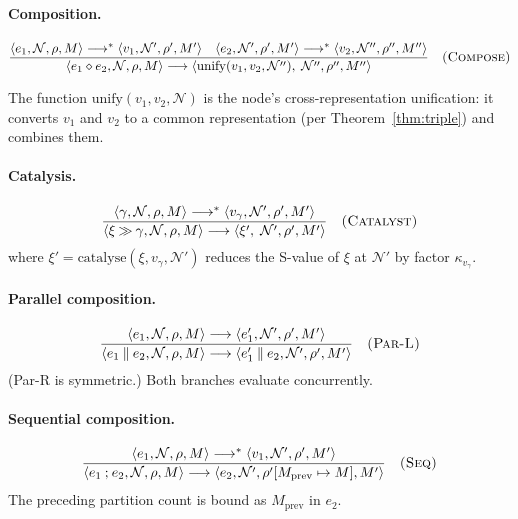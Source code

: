 \documentclass[twocolumn,11pt,a4paper]{article}
\theoremstyle{definition}
\theoremstyle{remark}
\newcommand{\Node}{\mathcal{N}}
\newcommand{\reduces}{\longrightarrow}
\newcommand{\reducesN}{\longrightarrow^{*}}
\newcommand{\catal}{\mathbin{\gg}}
\newcommand{\comp}{\mathbin{\diamond}}
\newcommand{\par}{\mathbin{\parallel}}
\newcommand{\seq}{\mathbin{;}}
\begin{document}
\paragraph{Composition.}
\[
\frac{\langle e_1, \Node, \rho, M \rangle \reducesN
      \langle v_1, \Node', \rho', M' \rangle \quad
      \langle e_2, \Node', \rho', M' \rangle \reducesN
      \langle v_2, \Node'', \rho'', M'' \rangle}
     {\langle e_1 \comp e_2, \Node, \rho, M \rangle \reduces
      \langle \mathrm{unify}(v_1, v_2, \Node''),\; \Node'', \rho'', M'' \rangle}
\quad\textsc{(Compose)}
\]

The function $\mathrm{unify}(v_1, v_2, \Node)$ is the node's
cross-representation unification: it converts $v_1$ and $v_2$ to a
common representation (per Theorem~\ref{thm:triple}) and combines them.

\paragraph{Catalysis.}
\[
\frac{\langle \gamma, \Node, \rho, M \rangle \reducesN
      \langle v_\gamma, \Node', \rho', M' \rangle}
     {\langle \xi \catal \gamma, \Node, \rho, M \rangle \reduces
      \langle \xi',\; \Node', \rho', M' \rangle}
\quad\textsc{(Catalyst)}
\]
where $\xi' = \mathrm{catalyse}(\xi, v_\gamma, \Node')$ reduces the
S-value of $\xi$ at $\Node'$ by factor $\kappa_{v_\gamma}$.

\paragraph{Parallel composition.}
\[
\frac{\langle e_1, \Node, \rho, M \rangle \reduces
      \langle e_1', \Node', \rho', M' \rangle}
     {\langle e_1 \par e_2, \Node, \rho, M \rangle \reduces
      \langle e_1' \par e_2, \Node', \rho', M' \rangle}
\quad\textsc{(Par-L)}
\]
(Par-R is symmetric.)  Both branches evaluate concurrently.

\paragraph{Sequential composition.}
\[
\frac{\langle e_1, \Node, \rho, M \rangle \reducesN
      \langle v_1, \Node', \rho', M' \rangle}
     {\langle e_1 \seq e_2, \Node, \rho, M \rangle \reduces
      \langle e_2, \Node', \rho'[M_{\mathrm{prev}} \mapsto M], M' \rangle}
\quad\textsc{(Seq)}
\]
The preceding partition count is bound as $M_{\mathrm{prev}}$ in $e_2$.
\end{document}
